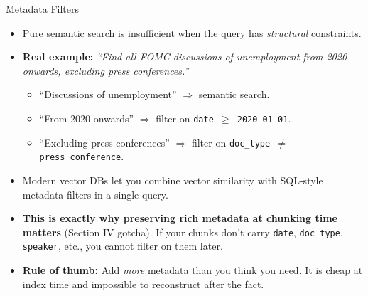 \begin{frame}{Metadata Filters}
\begin{itemize}
\item Pure semantic search is insufficient when the query has \emph{structural} constraints.

\medskip
\item \textbf{Real example:} \emph{``Find all FOMC discussions of unemployment from 2020 onwards, excluding press conferences.''}
\begin{itemize}
    \item ``Discussions of unemployment'' $\Rightarrow$ semantic search.
    \item ``From 2020 onwards'' $\Rightarrow$ filter on \texttt{date $\geq$ 2020-01-01}.
    \item ``Excluding press conferences'' $\Rightarrow$ filter on \texttt{doc\_type $\neq$ press\_conference}.
\end{itemize}

\medskip
\item Modern vector DBs let you combine vector similarity with SQL-style metadata filters in a single query.

\medskip
\item \textbf{This is exactly why preserving rich metadata at chunking time matters} (Section IV gotcha). If your chunks don't carry \texttt{date}, \texttt{doc\_type}, \texttt{speaker}, etc., you cannot filter on them later.

\medskip
\item \textbf{Rule of thumb:} Add \emph{more} metadata than you think you need. It is cheap at index time and impossible to reconstruct after the fact.
\end{itemize}
\end{frame}

